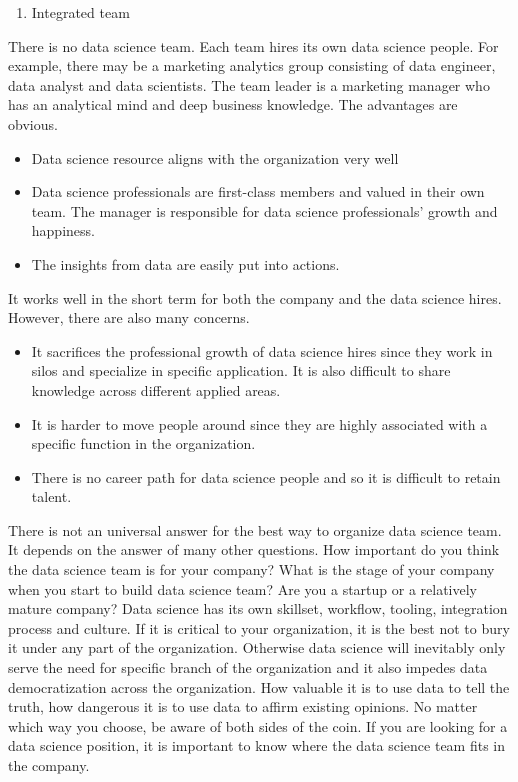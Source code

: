 \documentclass[12pt,]{krantz}
\providecommand{\tightlist}{%
  \setlength{\itemsep}{0pt}\setlength{\parskip}{0pt}}
\begin{document}
\begin{enumerate}
\def\labelenumi{(\arabic{enumi})}
\setcounter{enumi}{2}
\tightlist
\item
  Integrated team
\end{enumerate}

There is no data science team. Each team hires its own data science people. For example, there may be a marketing analytics group consisting of data engineer, data analyst and data scientists. The team leader is a marketing manager who has an analytical mind and deep business knowledge. The advantages are obvious.

\begin{itemize}
\tightlist
\item
  Data science resource aligns with the organization very well
\item
  Data science professionals are first-class members and valued in their own team. The manager is responsible for data science professionals' growth and happiness.
\item
  The insights from data are easily put into actions.
\end{itemize}

It works well in the short term for both the company and the data science hires. However, there are also many concerns.

\begin{itemize}
\tightlist
\item
  It sacrifices the professional growth of data science hires since they work in silos and specialize in specific application. It is also difficult to share knowledge across different applied areas.
\item
  It is harder to move people around since they are highly associated with a specific function in the organization.
\item
  There is no career path for data science people and so it is difficult to retain talent.
\end{itemize}

There is not an universal answer for the best way to organize data science team. It depends on the answer of many other questions. How important do you think the data science team is for your company? What is the stage of your company when you start to build data science team? Are you a startup or a relatively mature company? Data science has its own skillset, workflow, tooling, integration process and culture. If it is critical to your organization, it is the best not to bury it under any part of the organization. Otherwise data science will inevitably only serve the need for specific branch of the organization and it also impedes data democratization across the organization. How valuable it is to use data to tell the truth, how dangerous it is to use data to affirm existing opinions. No matter which way you choose, be aware of both sides of the coin. If you are looking for a data science position, it is important to know where the data science team fits in the company.
\end{document}
